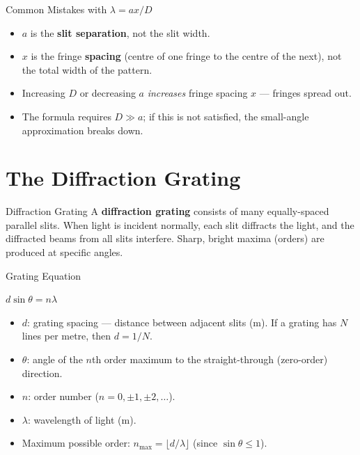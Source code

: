 \begin{warningbox}{Common Mistakes with \texorpdfstring{$\lambda = ax/D$}{lambda = ax/D}}
\begin{itemize}[itemsep=2pt]
  \item $a$ is the \textbf{slit separation}, not the slit width.
  \item $x$ is the fringe \textbf{spacing} (centre of one fringe to the centre of the next), not the total width of the pattern.
  \item Increasing $D$ or decreasing $a$ \emph{increases} fringe spacing $x$ — fringes spread out.
  \item The formula requires $D \gg a$; if this is not satisfied, the small-angle approximation breaks down.
\end{itemize}
\end{warningbox}


\pagebreak


\section{The Diffraction Grating}

\begin{definitionbox}{Diffraction Grating}
A \textbf{diffraction grating} consists of many equally-spaced parallel slits. When light is incident normally, each slit diffracts the light, and the diffracted beams from all slits interfere. Sharp, bright maxima (orders) are produced at specific angles.
\end{definitionbox}

\begin{formulabox}{Grating Equation}
\begin{center}
\Large $d\sin\theta = n\lambda$
\end{center}
\vspace{0.3em}
\begin{itemize}[itemsep=2pt]
  \item $d$: grating spacing — distance between adjacent slits (m). If a grating has $N$ lines per metre, then $d = 1/N$.
  \item $\theta$: angle of the $n$th order maximum to the straight-through (zero-order) direction.
  \item $n$: order number ($n = 0, \pm1, \pm2, \ldots$).
  \item $\lambda$: wavelength of light (m).
  \item Maximum possible order: $n_{\max} = \lfloor d/\lambda \rfloor$ (since $\sin\theta \leq 1$).
\end{itemize}
\end{formulabox}

